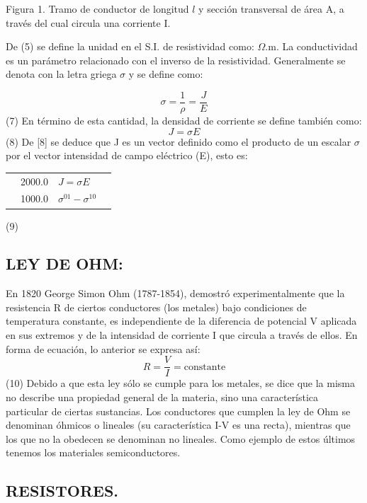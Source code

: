 \documentclass[11pt,a4paper]{article}
\begin{document}
Figura 1. Tramo de conductor de longitud $l$ y sección transversal de área A, a través del cual circula una corriente I.

De (5) se define la unidad en el S.I. de resistividad como: $\Omega$.m. La conductividad es un parámetro relacionado con el inverso de la resistividad. Generalmente se denota con la letra griega $\sigma$ y se define como:

\[\sigma = \frac{1}{\rho} = \frac{J}{E}\] (7) En término de esta cantidad, la densidad de corriente se define también como: \[J = \sigma E\] (8) De [8] se deduce que J es un vector definido como el producto de un escalar $\sigma$ por el vector intensidad de campo eléctrico (E), esto es:

\begin{center}\small
\begin{tabular}{llll}
\toprule
 &  &  &  \\
\midrule
 & 2000.0 & $J = \sigma E$ &  \\
 & 1000.0 & $\sigma^{01} - \sigma^{10}$ &  \\
\bottomrule
\end{tabular}
\end{center}

(9)

\subsection*{LEY DE OHM:}

En 1820 George Simon Ohm (1787-1854), demostró experimentalmente que la resistencia R de ciertos conductores (los metales) bajo condiciones de temperatura constante, es independiente de la diferencia de potencial V aplicada en sus extremos y de la intensidad de corriente I que circula a través de ellos. En forma de ecuación, lo anterior se expresa así: \[R = \frac{V}{I} = \text{constante}\] (10) Debido a que esta ley sólo se cumple para los metales, se dice que la misma no describe una propiedad general de la materia, sino una característica particular de ciertas sustancias. Los conductores que cumplen la ley de Ohm se denominan óhmicos o lineales (su característica I-V es una recta), mientras que los que no la obedecen se denominan no lineales. Como ejemplo de estos últimos tenemos los materiales semiconductores.

\subsection*{RESISTORES.}
\end{document}
